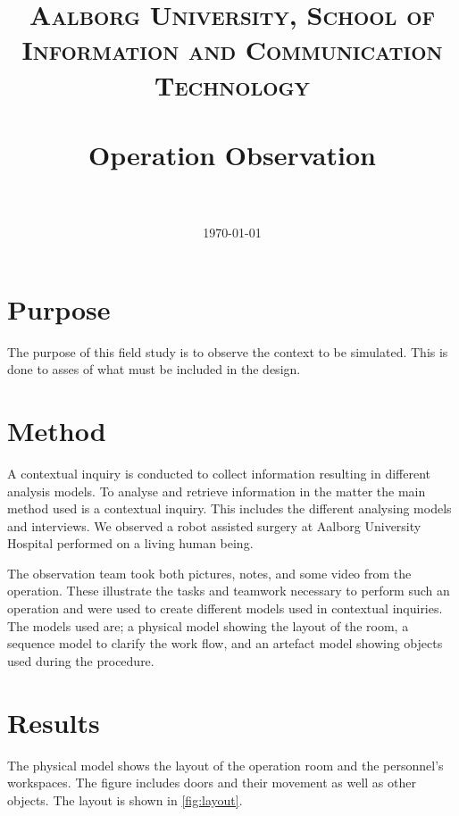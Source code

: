 \documentclass[paper=a4, fontsize=11pt]{scrartcl} %
\title{	
\normalfont \normalsize 
\textsc{Aalborg University, School of Information and Communication Technology} \\ [25pt] %
\horrule{0.5pt} \\[0.4cm] %
\huge Operation Observation \\ %
\horrule{2pt} \\[0.5cm] %
}
\date{\normalsize\today} %
\numberwithin{equation}{section} %
\numberwithin{figure}{section} %
\numberwithin{table}{section} %
\begin{document}
\maketitle %


\section{Purpose}
The purpose of this field study is to observe the context to be simulated. This is done to asses of what must be included in the design.

\section{Method}
A contextual inquiry is conducted to collect information resulting in different analysis models.
To analyse and retrieve information in the matter the main method used is a contextual inquiry. This includes the different analysing models and interviews. We observed a robot assisted surgery at Aalborg University Hospital performed on a living human being.

The observation team took both pictures, notes, and some video from the operation. These illustrate the tasks and teamwork necessary to perform such an operation and were used to create different models used in contextual inquiries. The models used are; a physical model showing the layout of the room, a sequence model to clarify the work flow, and an artefact model showing objects used during the procedure.

\section{Results}
The physical model shows the layout of the operation room and the personnel's workspaces. The figure includes doors and their movement as well as other objects. The layout is shown in \autoref{fig:layout}.
\end{document}
